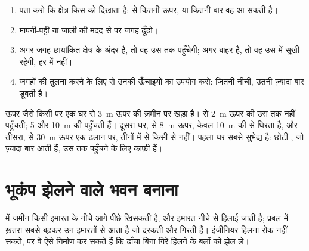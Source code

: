 \begin{method}[बाढ़ क्षेत्र का मानचित्र पढ़ना]
\begin{enumerate}
  \item पता करो कि क्षेत्र किस  को दिखाता है:  से कितनी ऊपर, या कितनी बार वह
        आ सकती है।
  \item मापनी-पट्टी या जाली की मदद से  पर जगह ढूँढो।
  \item अगर जगह छायांकित क्षेत्र के अंदर है, तो वह  उस तक पहुँचेगी; अगर बाहर है,
        तो वह उस  में सूखी रहेगी, हर  में
        नहीं।
  \item जगहों की तुलना करने के लिए  से उनकी ऊँचाइयों का उपयोग करो: जितनी नीची,
        उतनी ज़्यादा बार डूबती है।
\end{enumerate}
\end{method}

\begin{example}[नदी के बगल में तीन घर]
ऊपर जैसे किसी  पर एक घर  से \qty{3}{m} ऊपर की ज़मीन पर खड़ा है।  से
\qty{2}{m} ऊपर की  उस तक नहीं पहुँचती; 5 और \qty{10}{m} की  पहुँचती हैं।
दूसरा घर,  से \qty{8}{m} ऊपर, केवल \qty{10}{m} की  से घिरता है, और तीसरा, 
से \qty{30}{m} ऊपर एक ढलान पर, तीनों में से किसी से नहीं। पहला घर सबसे सुभेद्य है:
छोटी , जो ज़्यादा बार आती हैं, उस तक पहुँचने के लिए काफ़ी
हैं।
\end{example}

\section{भूकंप झेलने वाले भवन बनाना}

 में ज़मीन किसी इमारत के नीचे आगे-पीछे खिसकती है, और इमारत नीचे से हिलाई जाती है;
प्रबल  में ख़तरा सबसे बढ़कर उन इमारतों से आता है जो दरकती और गिरती हैं। इंजीनियर
हिलना रोक नहीं सकते, पर वे ऐसे निर्माण कर सकते हैं कि ढाँचा बिना गिरे हिलने के बलों को
झेल ले।

